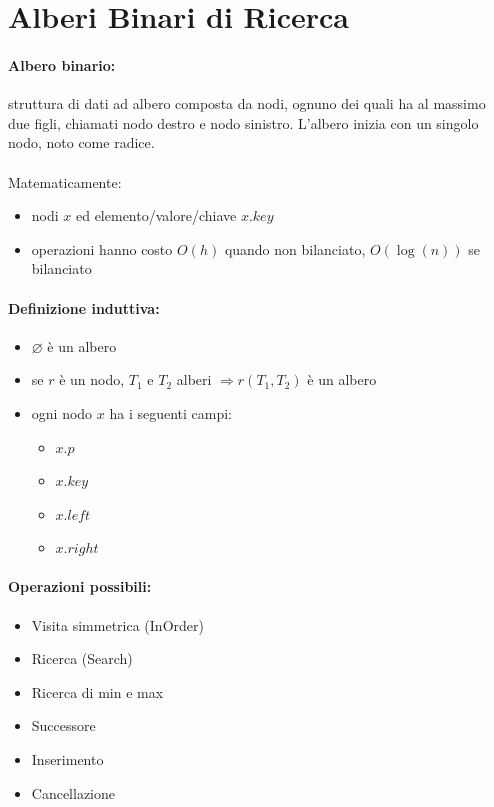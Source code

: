 \section{Alberi Binari di Ricerca}
\paragraph{Albero binario:} struttura di dati ad albero composta da nodi, ognuno dei quali ha al massimo due figli, chiamati nodo destro e nodo sinistro. L'albero inizia con un singolo nodo, noto come radice. \\~\\

Matematicamente:
\begin{itemize}
    \item nodi $x$ ed elemento/valore/chiave $x.key$
    \item operazioni hanno costo $O(h)$ quando non bilanciato, $O(\log(n))$ se bilanciato
\end{itemize}

\paragraph{Definizione induttiva:}
\begin{itemize}
    \item $\varnothing$ è un albero
    \item se $r$ è un nodo, $T_1$ e $T_2$ alberi $\Rightarrow r(T_1,T_2)$ è un albero
    \item ogni nodo $x$ ha i seguenti campi:
    \begin{itemize}
        \item $x.p$
        \item $x.key$
        \item $x.left$
        \item $x.right$
    \end{itemize}
\end{itemize}

\paragraph{Operazioni possibili:}
\begin{itemize}
    \item Visita simmetrica (InOrder)
    \item Ricerca (Search)
    \item Ricerca di min e max
    \item Successore
    \item Inserimento
    \item Cancellazione
\end{itemize}

